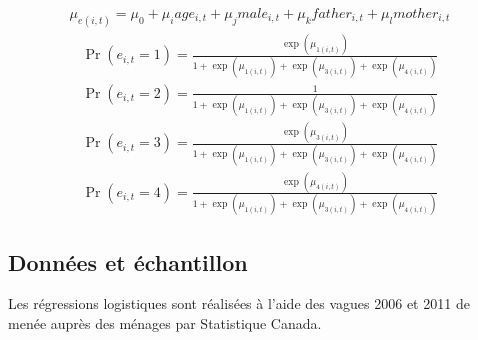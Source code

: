 \documentclass[letterpaper,10pt,french]{sphinxmanual}
\begin{document}
\begin{equation*}
\begin{split}\mu_{e(i,t)} = \mu_{0} + \mu_{i} age_{i,t} + \mu_{j} male_{i,t} + \mu_{k} father_{i,t} + \mu_{l} mother_{i,t}\end{split}
\end{equation*}\begin{equation*}
\begin{split}\Pr(e_{i,t}=1) = \frac{\exp(\mu_{1(i,t)})}{1+\exp(\mu_{1(i,t)})+\exp(\mu_{3(i,t)})+\exp(\mu_{4(i,t)})}\end{split}
\end{equation*}\begin{equation*}
\begin{split}\Pr(e_{i,t}=2) = \frac{1}{1+\exp(\mu_{1(i,t)})+\exp(\mu_{3(i,t)})+\exp(\mu_{4(i,t)})}\end{split}
\end{equation*}\begin{equation*}
\begin{split}\Pr(e_{i,t}=3) = \frac{\exp(\mu_{3(i,t)})}{1+\exp(\mu_{1(i,t)})+\exp(\mu_{3(i,t)})+\exp(\mu_{4(i,t)})}\end{split}
\end{equation*}\begin{equation*}
\begin{split}\Pr(e_{i,t}=4) = \frac{\exp(\mu_{4(i,t)})}{1+\exp(\mu_{1(i,t)})+\exp(\mu_{3(i,t)})+\exp(\mu_{4(i,t)})}\end{split}
\end{equation*}

\subsection{Données et échantillon}
\label{\detokenize{methodologie:id2}}
Les régressions logistiques sont réalisées à l’aide des vagues 2006 et 2011 de  menée auprès des ménages par Statistique Canada.
\end{document}
